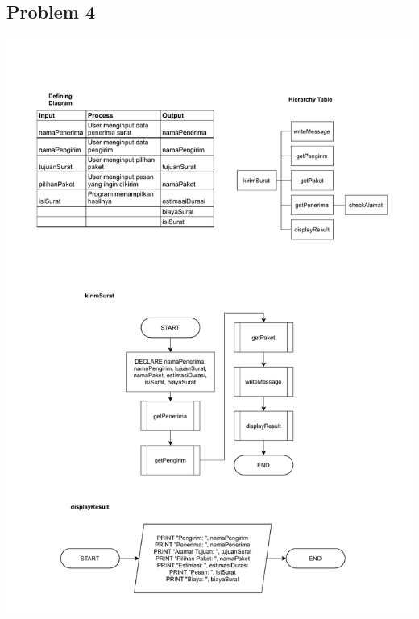\documentclass[
  12pt,
  answers  
]{exam}
\begin{document}
	\subsection*{Problem 4}
	\begin{center}
		\includegraphics[clip, scale=0.9, trim={1cm 1cm 1cm 3cm}]{pdf/Problem4-1.pdf}
	\end{center}
	\pagebreak
\end{document}

